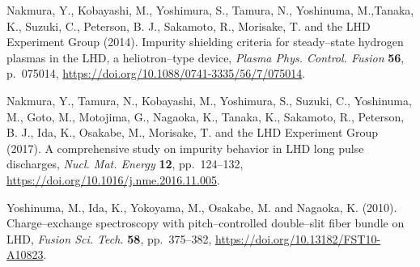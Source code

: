 \documentclass[a4paper,openany,12pt]{report}
\begin{document}
\begin{thebibliography}{175}

\bibitem{}
Nakmura, Y., Kobayashi, M., Yoshimura, S., Tamura, N., Yoshinuma, M.,Tanaka, K., Suzuki, C., Peterson, B. J., Sakamoto, R., Morisake, T. and the LHD Experiment Group (2014). Impurity shielding criteria for steady--state hydrogen plasmas in the LHD, a heliotron--type device, \emph{Plasma Phys. Control. Fusion} \textbf{56}, p.~075014, \url{https://doi.org/10.1088/0741-3335/56/7/075014}.

\bibitem{}
Nakmura, Y., Tamura, N., Kobayashi, M., Yoshimura, S., Suzuki, C., Yoshinuma, M., Goto, M., Motojima, G., Nagaoka, K., Tanaka, K., Sakamoto, R., Peterson, B. J., Ida, K., Osakabe, M., Morisake, T. and the LHD Experiment Group (2017). A comprehensive study on impurity behavior in LHD long pulse discharges, \emph{Nucl. Mat. Energy} \textbf{12}, pp.~124--132, \url{https://doi.org/10.1016/j.nme.2016.11.005}.

\bibitem{}
Yoshinuma, M., Ida, K., Yokoyama, M., Osakabe, M. and Nagaoka, K. (2010). Charge--exchange spectroscopy with pitch--controlled double--slit fiber bundle on LHD, \emph{Fusion Sci. Tech.} \textbf{58}, pp.~375--382, \url{https://doi.org/10.13182/FST10-A10823}.

\end{thebibliography}
\end{document}
